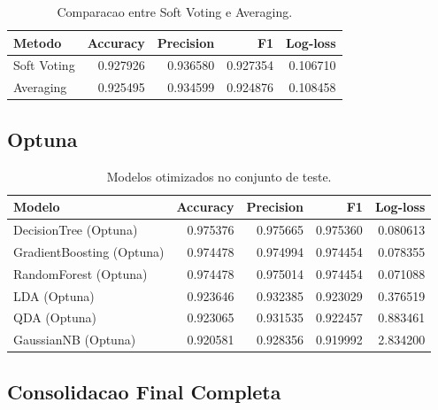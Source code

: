 \documentclass[12pt,a4paper]{article}
\begin{document}
\begin{table}[H]
\centering
\caption{Comparacao entre Soft Voting e Averaging.}
\begin{tabular}{lrrrr}
\toprule
Metodo & Accuracy & Precision & F1 & Log-loss \\
\midrule
Soft Voting & 0.927926 & 0.936580 & 0.927354 & 0.106710 \\
Averaging & 0.925495 & 0.934599 & 0.924876 & 0.108458 \\
\bottomrule
\end{tabular}
\end{table}

\subsection{Optuna}

\begin{table}[H]
\centering
\caption{Modelos otimizados no conjunto de teste.}
\begin{tabular}{lrrrr}
\toprule
Modelo & Accuracy & Precision & F1 & Log-loss \\
\midrule
DecisionTree (Optuna) & 0.975376 & 0.975665 & 0.975360 & 0.080613 \\
GradientBoosting (Optuna) & 0.974478 & 0.974994 & 0.974454 & 0.078355 \\
RandomForest (Optuna) & 0.974478 & 0.975014 & 0.974454 & 0.071088 \\
LDA (Optuna) & 0.923646 & 0.932385 & 0.923029 & 0.376519 \\
QDA (Optuna) & 0.923065 & 0.931535 & 0.922457 & 0.883461 \\
GaussianNB (Optuna) & 0.920581 & 0.928356 & 0.919992 & 2.834200 \\
\bottomrule
\end{tabular}
\end{table}

\subsection{Consolidacao Final Completa}
\end{document}
